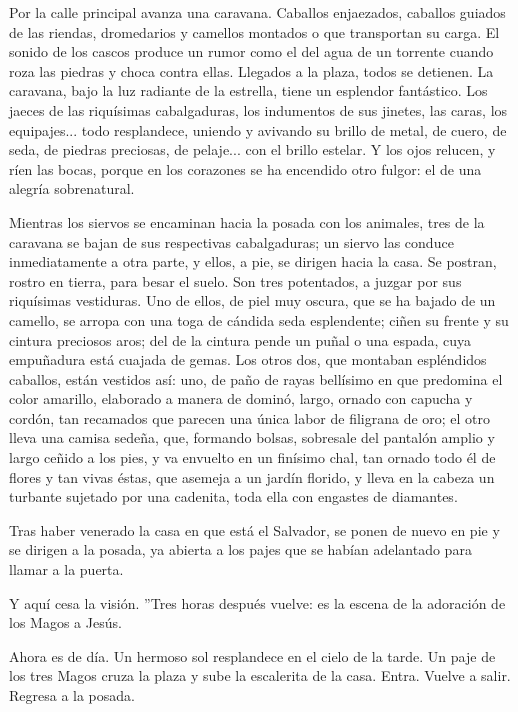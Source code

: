 \documentclass[12pt, twoside, openright]{book} %
\begin{document}
Por la calle principal avanza una caravana. Caballos enjaezados, caballos guiados de las riendas, dromedarios y camellos montados o que transportan su carga. El sonido de los cascos produce un rumor como el del agua de un torrente cuando roza las piedras y choca contra ellas. Llegados a la plaza, todos se detienen. La caravana, bajo la luz radiante de la estrella, tiene un esplendor fantástico. Los jaeces de las riquísimas cabalgaduras, los indumentos de sus jinetes, las caras, los equipajes... todo resplandece, uniendo y avivando su brillo de metal, de cuero, de seda, de piedras preciosas, de pelaje... con el brillo estelar. Y los ojos relucen, y ríen las bocas, porque en los corazones se ha encendido otro fulgor: el de una alegría sobrenatural. 

Mientras los siervos se encaminan hacia la posada con los animales, tres de la caravana se bajan de sus respectivas cabalgaduras; un siervo las conduce inmediatamente a otra parte, y ellos, a pie, se dirigen hacia la casa. Se postran, rostro en tierra, para besar el suelo. Son tres potentados, a juzgar por sus riquísimas vestiduras. Uno de ellos, de piel muy oscura, que se ha bajado de un camello, se arropa con una toga de cándida seda esplendente; ciñen su frente y su cintura preciosos aros; del de la cintura pende un puñal o una espada, cuya empuñadura está cuajada de gemas. Los otros dos, que montaban espléndidos caballos, están vestidos así: uno, de paño de rayas bellísimo en que predomina el color amarillo, elaborado a manera de dominó, largo, ornado con capucha y cordón, tan recamados que parecen una única labor de filigrana de oro; el otro lleva una camisa sedeña, que, formando bolsas, sobresale del pantalón amplio y largo ceñido a los pies, y va envuelto en un finísimo chal, tan ornado todo él de flores y tan vivas éstas, que asemeja a un jardín florido, y lleva en la cabeza un turbante sujetado por una cadenita, toda ella con engastes de diamantes. 

Tras haber venerado la casa en que está el Salvador, se ponen de nuevo en pie y se dirigen a la posada, ya abierta a los pajes que se habían adelantado para llamar a la puerta. 

Y aquí cesa la visión. ''Tres horas después vuelve: es la escena de la adoración de los Magos a Jesús. 

Ahora es de día. Un hermoso sol resplandece en el cielo de la tarde. Un paje de los tres Magos cruza la plaza y sube la escalerita de la casa. Entra. Vuelve a salir. Regresa a la posada. 
\end{document}

